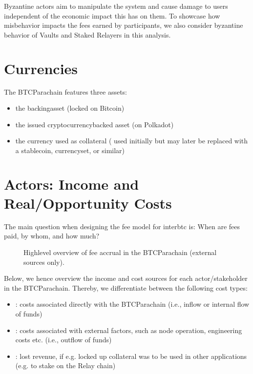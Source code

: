\documentclass[a4paper,10pt,english]{sphinxmanual}
\begin{document}
Byzantine actors aim to manipulate the system and cause damage to users \sphinxhyphen{} independent of the economic impact this has on them. To showcase how misbehavior impacts the fees earned by participants, we also consider byzantine behavior of Vaults and Staked Relayers in this analysis.


\section{Currencies}
\label{\detokenize{economics/fees:currencies}}
The BTC\sphinxhyphen{}Parachain features three assets:
\begin{itemize}
\item {} 
 \sphinxhyphen{} the backing\sphinxhyphen{}asset (locked on Bitcoin)

\item {} 
 \sphinxhyphen{} the issued cryptocurrency\sphinxhyphen{}backed asset (on Polkadot)

\item {} 
 \sphinxhyphen{} the currency used as collateral ( used initially but may later be replaced with a stablecoin, currency\sphinxhyphen{}set, or similar)

\end{itemize}


\section{Actors: Income and Real/Opportunity Costs}
\label{\detokenize{economics/fees:actors-income-and-real-opportunity-costs}}
The main question when designing the fee model for interbtc is: When are fees paid, by whom, and how much?

\begin{figure}[htbp]
\centering
\capstart

\noindent{}
\caption{High\sphinxhyphen{}level overview of fee accrual in the BTC\sphinxhyphen{}Parachain (external sources only).}\label{\detokenize{economics/fees:id2}}\end{figure}

Below, we hence overview the income and cost sources for each actor/stakeholder in the BTC\sphinxhyphen{}Parachain.
Thereby, we differentiate between the following cost types:
\begin{itemize}
\item {} 
: costs associated directly with the BTC\sphinxhyphen{}Parachain (i.e., inflow or internal flow of funds)

\item {} 
: costs associated with external factors, such as node operation, engineering costs etc. (i.e., outflow of funds)

\item {} 
: lost revenue, if e.g. locked up collateral was to be used in other applications (e.g. to stake on the Relay chain)

\end{itemize}
\end{document}
